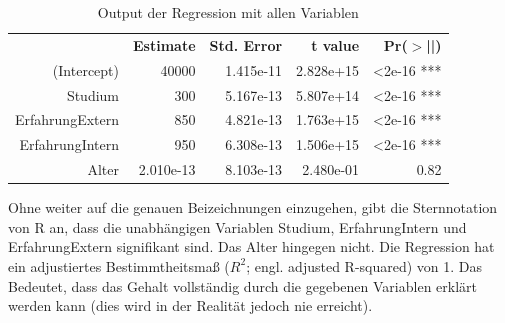 

\begin{table}[H]
\begin{tabular}{|rrrrr|}
  \hline
 & \textbf{Estimate} & \textbf{Std. Error} & \textbf{t value} & \textbf{Pr($>$||)} \\ 
  \hhline{=====}
(Intercept) & 40000 & 1.415e-11 & 2.828e+15 & <2e-16 *** \\ 
  Studium & 300 & 5.167e-13 & 5.807e+14 & <2e-16 *** \\ 
  ErfahrungExtern & 850 & 4.821e-13 & 1.763e+15  & <2e-16 *** \\ 
  ErfahrungIntern & 950 & 6.308e-13 & 1.506e+15 & <2e-16 *** \\ 
  Alter & 2.010e-13 & 8.103e-13 & 2.480e-01 & 0.82 \\ 
\hline
\end{tabular}
\caption{Output der Regression mit allen Variablen}
\label{tab:Regression1:output}
\end{table}

Ohne weiter auf die genauen Beizeichnungen einzugehen, gibt die Sternnotation von R an, dass die unabhängigen Variablen Studium, ErfahrungIntern und ErfahrungExtern signifikant sind. Das Alter hingegen nicht. Die Regression hat ein adjustiertes Bestimmtheitsmaß ($R^2$; engl. adjusted R-squared) von 1. Das Bedeutet, dass das Gehalt vollständig durch die gegebenen Variablen erklärt werden kann (dies wird in der Realität jedoch nie erreicht).

